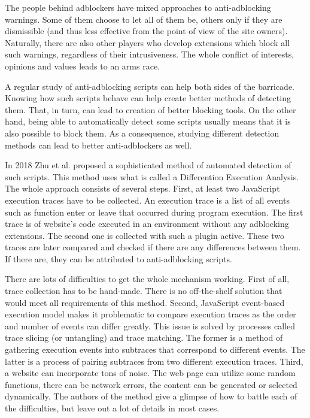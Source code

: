 The people behind adblockers have mixed approaches to anti-adblocking warnings.
Some of them choose to let all of them be, others only if they are dismissible (and thus 
less effective from the point of view of the site owners). Naturally, there are also other 
players who develop extensions which block all such warnings, regardless of their
intrusiveness. The whole conflict of interests, opinions and values leads to an arms race.

A regular study of anti-adblocking scripts can help both sides of the barricade. Knowing how such scripts behave
can help create better methods of detecting them. That, in turn, can lead to creation of better blocking tools.
On the other hand, being able to automatically detect some scripts usually means that it is also possible
to block them. As a consequence, studying different detection methods can lead to better anti-adblockers as well.

In 2018 Zhu et al. \cite{DBLP:conf/ndss/ZhuHQSY18} proposed a sophisticated method 
of automated detection of such scripts. This method uses what is called a Differention Execution Analysis. 
The whole approach consists of several steps.
First, at least two JavaScript execution traces have to be collected. An execution trace is a list of all events such
as function enter or leave that occurred during program execution. The first trace is of website's code executed
in an environment without any adblocking extensions. The second one is collected with such a plugin active.
These two traces are later compared and checked if there are any differences between them.
If there are, they can be attributed to anti-adblocking scripts.

There are lots of difficulties to get the whole mechanism working. First of all, trace collection has
to be hand-made. There is no off-the-shelf solution that would meet all requirements of this method.
Second, JavaScript event-based execution model makes it problematic to compare execution traces
as the order and number of events can differ greatly. This issue is solved 
by processes called trace slicing (or untangling) and trace matching. The former is a method of gathering 
execution events into subtraces that correspond to different events. The latter is a process of
pairing subtraces from two different execution traces.
Third, a website can incorporate tons of noise. The web page can utilize some random functions, 
there can be network errors, the content can be generated or selected dynamically.
The authors of the method give a glimpse of how to battle each of the difficulties, 
but leave out a lot of details in most cases. 

